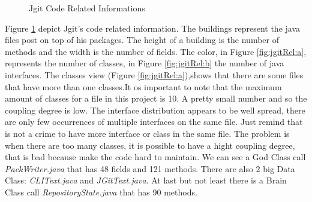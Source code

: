 \documentclass[]{usiinfbachelorproject}
\begin{document}
            \begin{figure}[h]
            \hspace*{\fill}
            
            \caption{Jgit Code Related Informations \label{fig:jgitRel}
            }
            \end{figure}


Figure \ref{fig:jgitRel} depict Jgit's code related information. The buildings represent the java files post on top of his packages. The height of a building is the number of methods and the width is the number of fields. The color, in Figure \ref{fig:jgitRel:a}, represents the number of classes, in Figure \ref{fig:jgitRel:b} the number of java interfaces.
The classes view (Figure \ref{fig:jgitRel:a}),shows that there are some files that have more than one classes.It os important to note that the maximum amount of classes for a file in this project is 10. A pretty small number and so the coupling degree is low. The interface distribution appears to be well spread, there are only few occurrences of multiple interfaces on the same file. Just remind that is not a crime to have more interface or class in the same file. The problem is when there are too many classes, it is possible to have a hight coupling degree, that is bad because make the code hard to maintain. We can see a God Class call  \textit{PackWriter.java} that has 48 fields and 121 methods. There are also 2 big Data Class: \textit{CLIText.java} and \textit{JGitText.java}. At last but not least there is a Brain Class call  \textit{RepositoryState.java} that has 90 methods.
 
\end{document}
